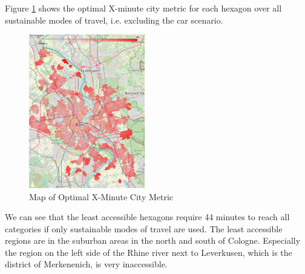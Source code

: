 Figure \ref{fig:optimal_map} shows the optimal X-minute city metric for each hexagon over all sustainable modes of travel, i.e. excluding the car scenario.
\begin{figure}
  \begin{center}
    \includegraphics[width=0.45\textwidth]{Figures/results/minute_city_metric/optimal_map}
  \end{center}
  \caption{Map of Optimal X-Minute City Metric}
  \label{fig:optimal_map}
\end{figure}
We can see that the least accessible hexagons require 44 minutes to reach all categories if only sustainable modes of travel are used.
The least accessible regions are in the suburban areas in the north and south of Cologne. 
Especially the region on the left side of the Rhine river next to Leverkusen, which is the district of Merkenenich, is very inaccessible.

